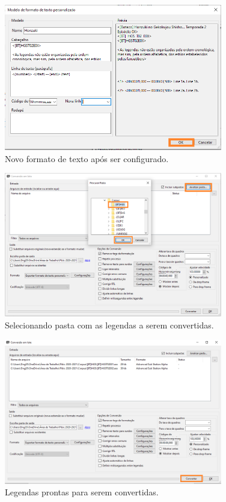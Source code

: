 \documentclass[portuguese]{textolivre}
\begin{document}
\begin{figure}[htbp]
 \centering
 \includegraphics[width=0.85\textwidth]{Fig23.png}
 \caption{Novo formato de texto após ser configurado.}
 \label{fig23}
\end{figure}

\begin{figure}[htbp]
 \centering
 \includegraphics[width=0.85\textwidth]{Fig24.png}
 \caption{Selecionando pasta com as legendas a serem convertidas.}
 \label{fig24}
\end{figure}

\begin{figure}[htbp]
 \centering
 \includegraphics[width=0.85\textwidth]{Fig25.png}
 \caption{Legendas prontas para serem convertidas.}
 \label{fig25}
\end{figure}
\end{document}
